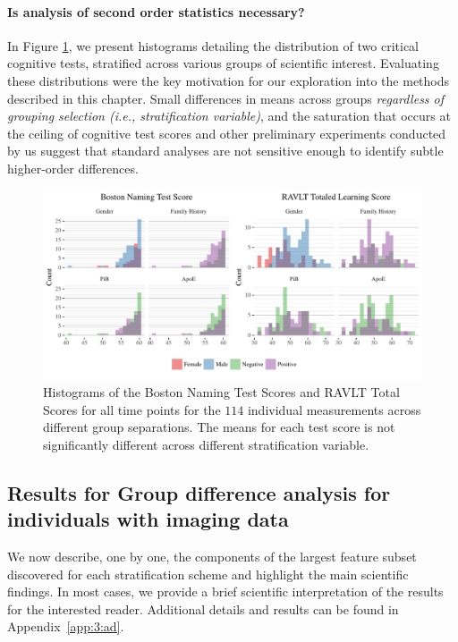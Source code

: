 \paragraph{Is analysis of second order statistics necessary?} In Figure \ref{fig:imagehists}, we present histograms detailing the distribution of two critical cognitive tests, stratified across various groups of scientific interest. Evaluating these distributions were the key motivation for our exploration into the methods described in this chapter. Small differences in means across groups {\em regardless of grouping selection (i.e., stratification variable)}, and the saturation that occurs at the ceiling of cognitive test scores and other preliminary experiments conducted by us suggest that standard analyses are not sensitive enough to identify subtle higher-order differences.
\begin{figure}
	\centering
	\includegraphics[width=\textwidth]{3_covtraj/figs/hists.pdf}
	\caption[Neuropsychological test score summaries for preclinical AD participants]{Histograms of the Boston Naming Test Scores and RAVLT Total Scores for all time points for the $114$ individual measurements across different group separations. The means for each test score is not significantly different across different stratification variable.}
	\label{fig:imagehists}
\end{figure}
\subsection{Results for Group difference analysis for individuals with imaging data}
We now describe, one by one, the components of the largest feature subset discovered for each stratification scheme 
and highlight the main scientific findings. In most cases, we provide a brief scientific interpretation of the results
for the interested reader. 
Additional details and results can be found in Appendix~\ref{app:3:ad}.
%

